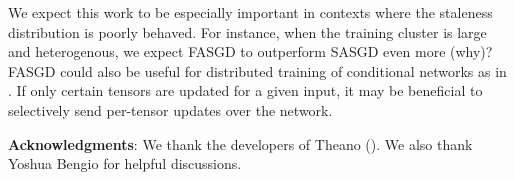 \documentclass{article} %
\begin{document}
We expect this work to be especially important in contexts where the staleness distribution is poorly behaved.
For instance, when the training cluster is large and heterogenous, we expect FASGD to outperform SASGD even more (why)?
FASGD could also be useful for distributed training of conditional networks as in \cite{Conditional}.
If only certain tensors are updated for a given input,
it may be beneficial to selectively send per-tensor updates over the network. 

{\bf Acknowledgments}: We thank the developers of Theano (\cite{Theano}).
We also thank Yoshua Bengio for helpful discussions. 

\newpage

\nocite{*}


\end{document}
